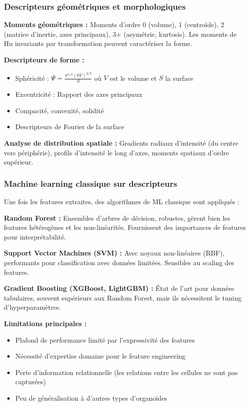 \subsubsection{Descripteurs géométriques et morphologiques}

\textbf{Moments géométriques :}
Moments d'ordre 0 (volume), 1 (centroïde), 2 (matrice d'inertie, axes principaux), 3+ (asymétrie, kurtosis). Les moments de Hu invariants par transformation peuvent caractériser la forme.

\textbf{Descripteurs de forme :}
\begin{itemize}
    \item Sphéricité : $\Psi = \frac{\pi^{1/3}(6V)^{2/3}}{S}$ où $V$ est le volume et $S$ la surface
    \item Excentricité : Rapport des axes principaux
    \item Compacité, convexité, solidité
    \item Descripteurs de Fourier de la surface
\end{itemize}

\textbf{Analyse de distribution spatiale :}
Gradients radiaux d'intensité (du centre vers périphérie), profils d'intensité le long d'axes, moments spatiaux d'ordre supérieur.

\subsubsection{Machine learning classique sur descripteurs}

Une fois les features extraites, des algorithmes de ML classique sont appliqués :

\textbf{Random Forest :}
Ensembles d'arbres de décision, robustes, gèrent bien les features hétérogènes et les non-linéarités. Fournissent des importances de features pour interprétabilité.

\textbf{Support Vector Machines (SVM) :}
Avec noyaux non-linéaires (RBF), performants pour classification avec données limitées. Sensibles au scaling des features.

\textbf{Gradient Boosting (XGBoost, LightGBM) :}
État de l'art pour données tabulaires, souvent supérieurs aux Random Forest, mais ils nécessitent le tuning d'hyperparamètres.

\textbf{Limitations principales :}
\begin{itemize}
    \item Plafond de performance limité par l'expressivité des features
    \item Nécessité d'expertise domaine pour le feature engineering
    \item Perte d'information relationnelle (les relations entre les cellules ne sont pas capturées)
    \item Peu de généralisation à d'autres types d'organoïdes
\end{itemize}

